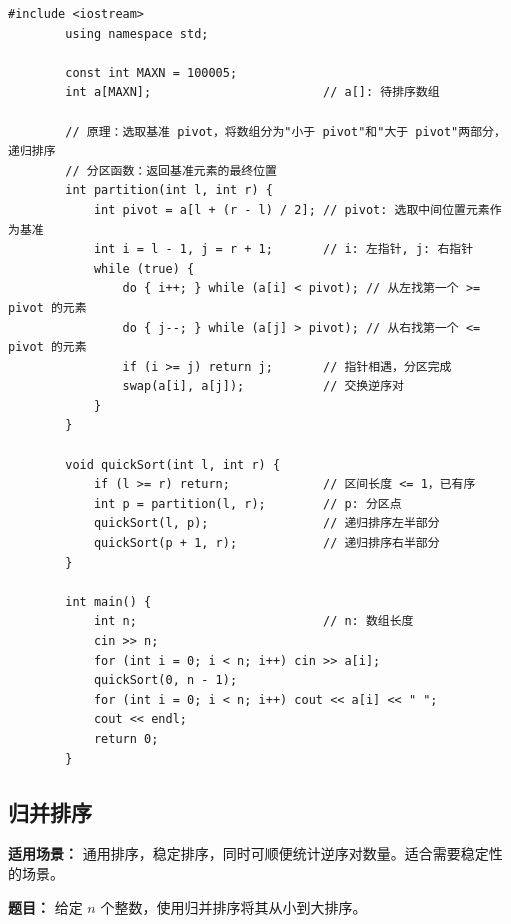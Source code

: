 \documentclass[12pt,a4paper]{ctexart}
\begin{document}
	\begin{lstlisting}[caption={快速排序——分治 + 分区}]
		#include <iostream>
		using namespace std;
		
		const int MAXN = 100005;
		int a[MAXN];                        // a[]: 待排序数组
		
		// 原理：选取基准 pivot，将数组分为"小于 pivot"和"大于 pivot"两部分，递归排序
		// 分区函数：返回基准元素的最终位置
		int partition(int l, int r) {
			int pivot = a[l + (r - l) / 2]; // pivot: 选取中间位置元素作为基准
			int i = l - 1, j = r + 1;       // i: 左指针, j: 右指针
			while (true) {
				do { i++; } while (a[i] < pivot); // 从左找第一个 >= pivot 的元素
				do { j--; } while (a[j] > pivot); // 从右找第一个 <= pivot 的元素
				if (i >= j) return j;       // 指针相遇，分区完成
				swap(a[i], a[j]);           // 交换逆序对
			}
		}
		
		void quickSort(int l, int r) {
			if (l >= r) return;             // 区间长度 <= 1，已有序
			int p = partition(l, r);        // p: 分区点
			quickSort(l, p);                // 递归排序左半部分
			quickSort(p + 1, r);            // 递归排序右半部分
		}
		
		int main() {
			int n;                          // n: 数组长度
			cin >> n;
			for (int i = 0; i < n; i++) cin >> a[i];
			quickSort(0, n - 1);
			for (int i = 0; i < n; i++) cout << a[i] << " ";
			cout << endl;
			return 0;
		}
	\end{lstlisting}
	
	\subsection{归并排序}
	\textbf{适用场景：} 通用排序，稳定排序，同时可顺便统计逆序对数量。适合需要稳定性的场景。
	
	\textbf{题目：} 给定 \(n\) 个整数，使用归并排序将其从小到大排序。
	
\end{document}
